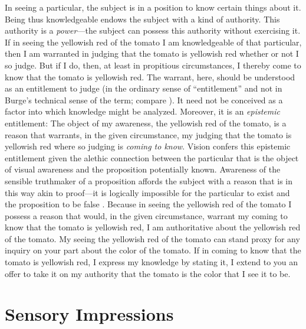 \documentclass[12pt]{article}
\begin{document}
In seeing a particular, the subject is in a position to know certain things about it. Being thus knowledgeable endows the subject with a kind of authority. This authority is a \emph{power}---the subject can possess this authority without exercising it. If in seeing the yellowish red of the tomato I am knowledgeable of that particular, then I am warranted in judging that the tomato is yellowish red whether or not I so judge. But if I do, then, at least in propitious circumstances, I thereby come to know that the tomato is yellowish red. The warrant, here, should be understood as an entitlement to judge (in the ordinary sense of ``entitlement'' and not in Burge's \citeyear{Burge:2003fk} technical sense of the term; compare \citealt[132n]{McDowell:2009ys}). It need not be conceived as a factor into which knowledge might be analyzed. Moreover, it is an \emph{epistemic} entitlement: The object of my awareness, the yellowish red of the tomato, is a reason that warrants, in the given circumstance, my judging that the tomato is yellowish red where so judging is \emph{coming to know}. Vision confers this epistemic entitlement given the alethic connection between the particular that is the object of visual awareness and the proposition potentially known. Awareness of the sensible truthmaker of a proposition affords the subject with a reason that is in this way akin to proof---it is logically impossible for the particular to exist and the proposition to be false \citep[see][]{Cook-Wilson:1926sf,Kalderon:2010fk,Travis:2005kx}. Because in seeing the yellowish red of the tomato I possess a reason that would, in the given circumstance, warrant my coming to know that the tomato is yellowish red, I am authoritative about the yellowish red of the tomato. My seeing the yellowish red of the tomato can stand proxy for any inquiry on your part about the color of the tomato. If in coming to know that the tomato is yellowish red, I express my knowledge by stating it, I extend to you an offer to take it on my authority that the tomato is the color that I see it to be. 


\section{Sensory Impressions} %
\label{sec:sensory_impressions}
\end{document}
